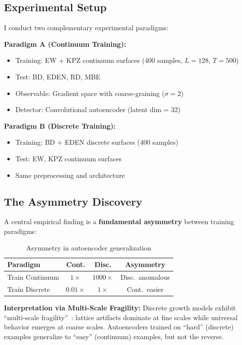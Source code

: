 \documentclass[aps,pre,reprint,amsmath,amssymb,superscriptaddress]{revtex4-2}
\begin{document}
\subsection{Experimental Setup}

I conduct two complementary experimental paradigms:

\textbf{Paradigm A (Continuum Training):}
\begin{itemize}
\item Training: EW + KPZ continuum surfaces (400 samples, $L=128$, $T=500$)
\item Test: BD, EDEN, RD, MBE
\item Observable: Gradient space with coarse-graining ($\sigma=2$)
\item Detector: Convolutional autoencoder (latent dim = 32)
\end{itemize}

\textbf{Paradigm B (Discrete Training):}
\begin{itemize}
\item Training: BD + EDEN discrete surfaces (400 samples)
\item Test: EW, KPZ continuum surfaces
\item Same preprocessing and architecture
\end{itemize}

\subsection{The Asymmetry Discovery}

A central empirical finding is a \textbf{fundamental asymmetry} between training paradigms:

\begin{table}[h]
\centering
\caption{Asymmetry in autoencoder generalization}
\label{tab:asymmetry}
\footnotesize
\begin{tabular}{@{}lccc@{}}
\toprule
Paradigm & Cont. & Disc. & Asymmetry \\
\midrule
Train Continuum & $1\times$ & $1000\times$ & Disc.~anomalous \\
Train Discrete & $0.01\times$ & $1\times$ & Cont.~easier \\
\bottomrule
\end{tabular}
\end{table}

\textbf{Interpretation via Multi-Scale Fragility:} Discrete growth models exhibit ``multi-scale fragility''~\cite{HAL2016}: lattice artifacts dominate at fine scales while universal behavior emerges at coarse scales. Autoencoders trained on ``hard'' (discrete) examples generalize to ``easy'' (continuum) examples, but not the reverse.
\end{document}
